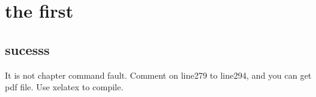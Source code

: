 \documentclass[master,xetex,arialtitle]{tongjithesis}
\begin{document}
\graphicspath{{figures/}}


\frontmatter

\makecover



\tableofcontents



\listoffigures

\listoftables

\listofequations

\mainmatter
\chapter{the first}
\section{sucesss}
It is not chapter command fault. Comment on line279 to line294, and you can get
pdf file. Use xelatex to compile.


\backmatter

\makeatother






\begin{appendix}

\end{appendix}


\end{document}
